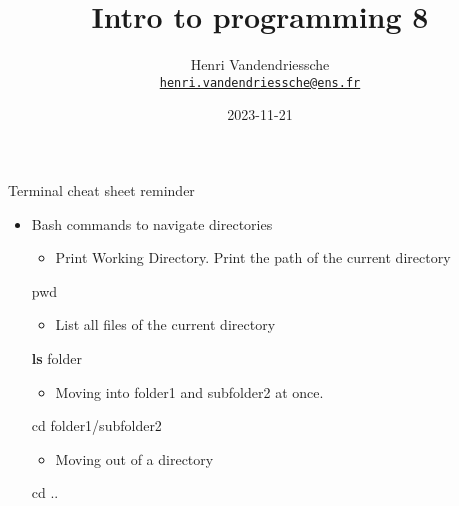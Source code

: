 \documentclass[
  8pt,
  ignorenonframetext,
]{beamer}
\title{Intro to programming 8}
\author{Henri Vandendriessche\\
\href{mailto:henri.vandendriessche@ens.fr}{\nolinkurl{henri.vandendriessche@ens.fr}}}
\date{2023-11-21}
\newenvironment{Shaded}{\begin{snugshade}}{\end{snugshade}}
\newcommand{\BuiltInTok}[1]{#1}
\newcommand{\FunctionTok}[1]{\textcolor[rgb]{0.13,0.29,0.53}{\textbf{#1}}}
\newcommand{\NormalTok}[1]{#1}
\providecommand{\tightlist}{%
  \setlength{\itemsep}{0pt}\setlength{\parskip}{0pt}}
\begin{document}
\frame{\titlepage}

\begin{frame}[fragile]{Terminal cheat sheet reminder}
\protect\hypertarget{terminal-cheat-sheet-reminder}{}
\begin{itemize}
\item
  Bash commands to navigate directories

  \begin{itemize}
  \tightlist
  \item
    Print Working Directory. Print the path of the current directory
  \end{itemize}

\begin{Shaded}
\begin{Highlighting}[]
\BuiltInTok{pwd}
\end{Highlighting}
\end{Shaded}

  \begin{itemize}
  \tightlist
  \item
    List all files of the current directory
  \end{itemize}

\begin{Shaded}
\begin{Highlighting}[]
\FunctionTok{ls}\NormalTok{ folder}
\end{Highlighting}
\end{Shaded}

  \begin{itemize}
  \tightlist
  \item
    Moving into folder1 and subfolder2 at once.
  \end{itemize}

\begin{Shaded}
\begin{Highlighting}[]
\BuiltInTok{cd}\NormalTok{ folder1/subfolder2}
\end{Highlighting}
\end{Shaded}

  \begin{itemize}
  \tightlist
  \item
    Moving out of a directory
  \end{itemize}

\begin{Shaded}
\begin{Highlighting}[]
\BuiltInTok{cd}\NormalTok{ ..}
\end{Highlighting}
\end{Shaded}


\end{itemize}
\end{frame}
\end{document}
